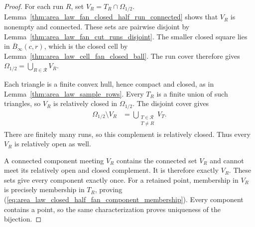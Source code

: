\begin{proof}\leanok
    For each run $R$, set $V_R=T_R\cap\Omega_{1/2}$.
    Lemma~\ref{thm:area_law_fan_closed_half_run_connected} shows
    that $V_R$ is nonempty and connected. These sets are pairwise
    disjoint by Lemma~\ref{thm:area_law_fan_cut_runs_disjoint}.
    The smaller closed square lies in
    $\overline B_\infty(c,r)$, which is the closed cell by
    Lemma~\ref{thm:area_law_cell_fan_closed_ball}. The run cover
    therefore gives $\Omega_{1/2}=\bigcup_{R\in\mathcal R}V_R$.

    Each triangle is a finite convex hull, hence compact and closed,
    as in Lemma~\ref{thm:area_law_sample_rows}. Every $T_R$ is a
    finite union of such triangles, so $V_R$ is relatively closed
    in $\Omega_{1/2}$. The disjoint cover gives
    \begin{align}
        \Omega_{1/2}\setminus V_R
         & =\bigcup_{\substack{T\in\mathcal R \\T\ne R}}V_T.
    \end{align}
    There are finitely many runs, so this complement is relatively
    closed. Thus every $V_R$ is relatively open as well.

    A connected component meeting $V_R$ contains the connected set
    $V_R$ and cannot meet its relatively open and closed complement.
    It is therefore exactly $V_R$. These sets give every component
    exactly once. For a retained point, membership in $V_R$ is
    precisely membership in $T_R$, proving
    (\ref{eq:area_law_closed_half_fan_component_membership}).
    Every component contains a point, so the same characterization
    proves uniqueness of the bijection.
\end{proof}
